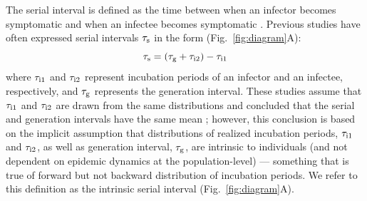 \documentclass[12pt]{article}
\newcommand{\fref}[1]{Fig.~\ref{fig:#1}}
\newcommand{\gtime}{\tau_{\rm g}} %
\begin{document}
The serial interval is defined as the time between when an infector becomes symptomatic and when an infectee becomes symptomatic \citep{svensson2007note}.
Previous studies have often expressed serial intervals $\tau_{\rm s}$ in the form (\fref{diagram}A):
\begin{equation}
\tau_{\rm s} = (\gtime + \tau_{\rm i2}) - \tau_{\rm i1}
\end{equation}
where $\tau_{\rm i1}$ and $\tau_{\rm i2}$ represent incubation periods of an infector and
an infectee, respectively, and $\gtime$ represents the generation
interval.  
These studies assume that $\tau_{\rm i1}$ and $\tau_{\rm i2}$ are drawn from the same distributions and concluded that the serial and generation intervals have the same mean \citep{svensson2007note,klinkenberg2011correlation,champredon2018equivalence, britton2019estimation};
however, this conclusion is based on the implicit assumption that distributions of realized incubation periods, $\tau_{\rm i1}$ and $\tau_{\rm i2}$, as well as generation interval, $\gtime$, are intrinsic to individuals (and not dependent on epidemic dynamics at the population-level) ---
something that is true of forward but not backward distribution of incubation periods.
We refer to this definition as the intrinsic
serial interval (\fref{diagram}A).
\end{document}
